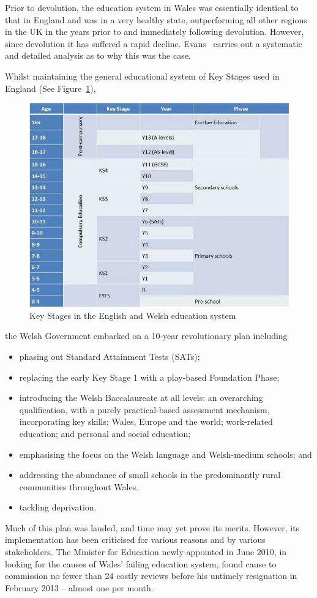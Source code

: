 \documentclass{sig-alternate}
\begin{document}
Prior to devolution, the education system in Wales was essentially
identical to that in England and was in a very healthy state,
outperforming all other regions in the UK
in the years prior to and immediately following devolution.
However, since devolution it has suffered a rapid decline.
Evans~\cite{Evans:2015} carries out a systematic and detailed
analysis as to why this was the case.

Whilst maintaining the general educational system of Key Stages
used in England (See Figure~\ref{fig:key-stages}),
\begin{figure}
  \centering
  \includegraphics[width=0.9\columnwidth]{images/keystages.png}
  \caption{Key Stages in the English and Welsh education system}
  \label{fig:key-stages}
\end{figure}
the Welsh Government embarked on a 10-year revolutionary plan
including
\begin{itemize}
\item
phasing out Standard Attainment Tests (SATs);
\item
replacing the early Key Stage 1 with
a play-based Foundation Phase;
\item
introducing the Welsh Baccalaureate at all levels:
an overarching qualification,
with a purely practical-based assessment mechanism,
incorporating
key skills; Wales, Europe and the world;
work-related education; and personal and social education;
\item
emphasising the focus on the Welsh language and  Welsh-medium schools;
and
\item
addressing the abundance of small schools in the 
predominantly rural communities throughout Wales.
\item
tackling deprivation.
\end{itemize}
Much of this plan was lauded, and time may yet prove its merits.
However, its implementation has been criticised
for various reasons and by various stakeholders.
The Minister for Education newly-appointed in June 2010,
in looking for the causes of Wales' failing education system,
found cause to commission
no fewer than 24 costly reviews
before his untimely resignation in February 2013 -- almost one per month.
\end{document}

